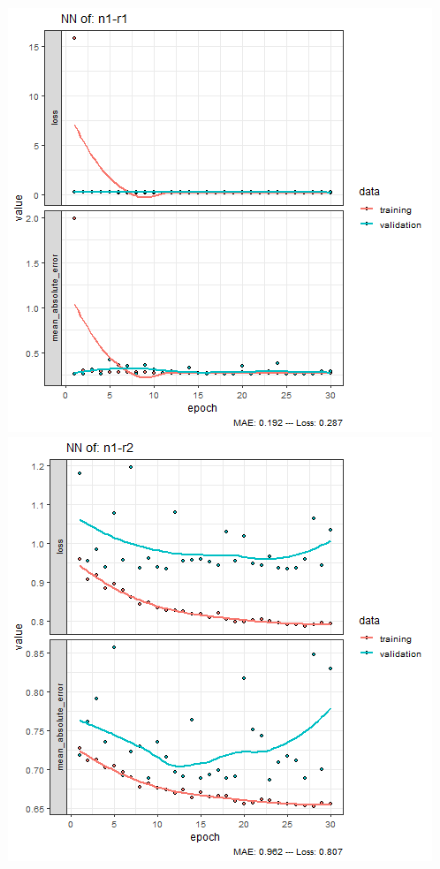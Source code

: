 \documentclass{FR16}
\begin{document}
\begin{figure}[!htb]
   \begin{minipage}{0.33\textwidth}
     \centering
     \includegraphics[width=1\linewidth]{figures/NN-n1-r1.png} 
   \end{minipage}\hfill
   \begin{minipage}{0.33\textwidth}
     \centering
     \includegraphics[width=1\linewidth]{figures/NN-n1-r2.png}

\end{minipage}
\end{figure}
\end{document}
